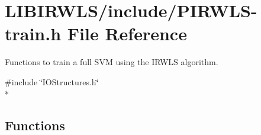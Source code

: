 \hypertarget{PIRWLS-train_8h}{}\section{L\+I\+B\+I\+R\+W\+L\+S/include/\+P\+I\+R\+W\+L\+S-\/train.h File Reference}
\label{PIRWLS-train_8h}


Functions to train a full S\+VM using the I\+R\+W\+LS algorithm.  


{\ttfamily \#include \char`\"{}I\+O\+Structures.\+h\char`\"{}}\\*
\subsection*{Functions}
